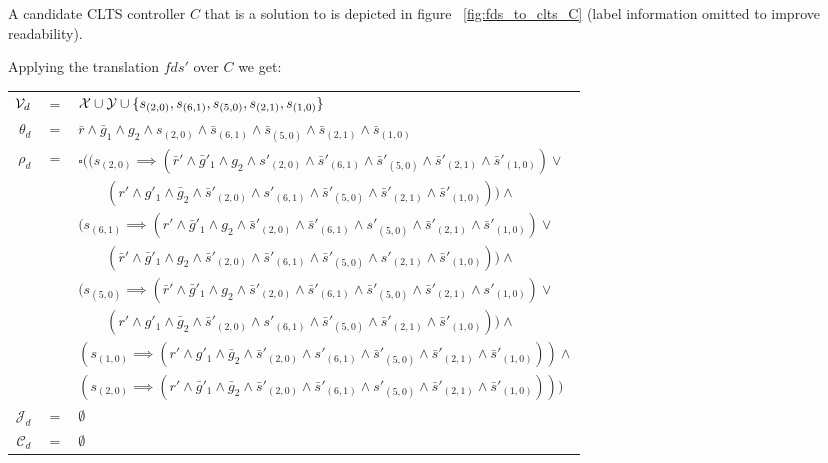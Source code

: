 A candidate CLTS controller $C$ that is a solution to \cltsCPEmbedding is depicted in figure ~\ref{fig:fds_to_clts_C} (label information omitted to improve readability).


Applying the translation $fds'$ over $C$ we get:

\footnotesize
\vspace{1em}
\begin{tabular}{ r c l }
	${\mathcal{V}}_{d}$ &$=$& ${\mathcal{X}} \cup {\ensuremath{\mathcal{Y}}} \cup \{s_{(2,0)},s_{(6,1)},s_{(5,0)},s_{(2,1)},s_{(1,0)}\}$\\	
	$\theta_{d}$ &$=$& $\bar{r} \wedge \bar{g}_1 \wedge g_2 \wedge s_{(2,0)}  \wedge \bar{s}_{(6,1)}  \wedge \bar{s}_{(5,0)}  \wedge \bar{s}_{(2,1)}  \wedge \bar{s}_{(1,0)}$\\						
	$\rho_{d}$ &$=$& $\square((s_{(2,0)}\implies (\bar{r}' \wedge \bar{g}'_1 \wedge g_2 \wedge s'_{(2,0)}  \wedge \bar{s}'_{(6,1)}  \wedge \bar{s}'_{(5,0)}  \wedge \bar{s}'_{(2,1)}  \wedge \bar{s}'_{(1,0)}) \vee$\\
	&&$\qquad(r' \wedge g'_1 \wedge \bar{g}_2 \wedge \bar{s}'_{(2,0)}  \wedge s'_{(6,1)}  \wedge \bar{s}'_{(5,0)}  \wedge \bar{s}'_{(2,1)}  \wedge \bar{s}'_{(1,0)})) \wedge$\\
	&& $(s_{(6,1)}\implies (r' \wedge \bar{g}'_1 \wedge g_2 \wedge \bar{s}'_{(2,0)}  \wedge \bar{s}'_{(6,1)}  \wedge s'_{(5,0)}  \wedge \bar{s}'_{(2,1)}  \wedge \bar{s}'_{(1,0)}) \vee$\\
	&&$\qquad(\bar{r}' \wedge \bar{g}'_1 \wedge g_2 \wedge \bar{s}'_{(2,0)}  \wedge \bar{s}'_{(6,1)}  \wedge \bar{s}'_{(5,0)}  \wedge s'_{(2,1)}  \wedge \bar{s}'_{(1,0)})) \wedge$\\		
	&& $(s_{(5,0)}\implies (\bar{r}' \wedge \bar{g}'_1 \wedge g_2 \wedge \bar{s}'_{(2,0)}  \wedge \bar{s}'_{(6,1)}  \wedge \bar{s}'_{(5,0)}  \wedge \bar{s}'_{(2,1)}  \wedge s'_{(1,0)}) \vee$\\
	&&$\qquad(r' \wedge g'_1 \wedge \bar{g}_2 \wedge \bar{s}'_{(2,0)}  \wedge s'_{(6,1)}  \wedge \bar{s}'_{(5,0)}  \wedge \bar{s}'_{(2,1)}  \wedge \bar{s}'_{(1,0)})) \wedge$\\			
	&& $(s_{(1,0)}\implies (r' \wedge g'_1 \wedge \bar{g}_2 \wedge \bar{s}'_{(2,0)}  \wedge s'_{(6,1)}  \wedge \bar{s}'_{(5,0)}  \wedge \bar{s}'_{(2,1)}  \wedge \bar{s}'_{(1,0)})) \wedge$\\				
	&& $(s_{(2,0)}\implies (r' \wedge \bar{g}'_1 \wedge \bar{g}_2 \wedge \bar{s}'_{(2,0)}  \wedge \bar{s}'_{(6,1)}  \wedge s'_{(5,0)}  \wedge \bar{s}'_{(2,1)}  \wedge \bar{s}'_{(1,0)})))$\\	
	$\mathcal{J}_d$ & $=$ & $\emptyset$\\
$\mathcal{C}_d$ & $=$ & $\emptyset$\\					
\end{tabular}
\vspace{1em}
\normalsize

